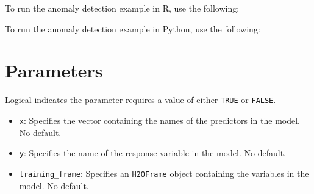 {{%
%
%                              
%                              
%
%
\waterExampleInR
To run the anomaly detection example in R, use the following: 


\waterExampleInPython
To run the anomaly detection example in Python, use the following: 


\noindent

\section{Parameters}
\label{sec:Parameters}

Logical indicates the parameter requires a value of either \texttt{TRUE} or \texttt{FALSE}. 

\begin{itemize}

\item \texttt{x}: Specifies the vector containing the names of the predictors in the model. No default.

\item \texttt{y}: Specifies the name of the response variable in the model. No default.

\item \texttt{training\_frame}: Specifies an \texttt{H2OFrame} object containing the variables in the model.  No default.


\end{itemize}}}
